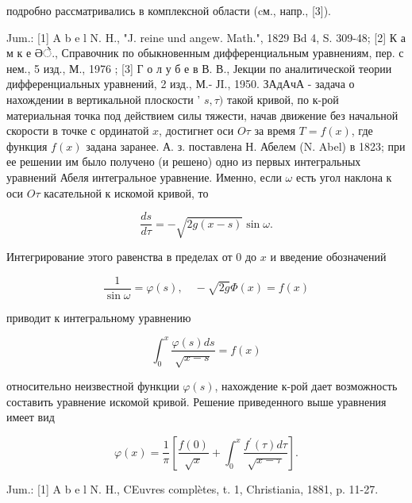 \documentclass[10pt]{article}
\begin{document}
подробно рассматривались в комплексной области (cм., напр., [3]).



Jum.: [1] A b e l N. H., "J. reine und angew. Math.", 1829 Bd 4, S. 309-48; [2] К а м к е Әे., Справочник по обыкновенным дифференциальным уравнениям, пер. с нем., 5 изд., М., 1976 ; [3] Г о л у б е в В. В., Јекции по аналитической теории дифференциальных уравнений, 2 изд., М.- ЈI., 1950. ЗАдАчА - задача о нахождении в вертикальной плоскости ' $s, \tau)$ такой кривой, по к-рой материальная точка под действием силы тяжести, начав движение без начальной скорости в точке с ординатой $x$, достигнет оси $O \tau$ за время $T=f(x)$, где функция $f(x)$ задана заранее. А. з. поставлена Н. Абелем (N. Abel) в 1823; при ее решении им было получено (и решено) одно из первых интегральных уравнений Абеля интегральное уравнение. Именно, если $\omega$ есть угол наклона к оси $O \tau$ касательной к искомой кривой, то



\[

\frac{d s}{d \tau}=-\sqrt{2 g(x-s)} \sin \omega .

\]



Интегрирование этого равенства в пределах от 0 до $x$ и введение обозначений



\[

\frac{1}{\sin \omega}=\varphi(s), \quad-\sqrt{2 g} \Phi(x)=f(x)

\]



приводит к интегральному уравнению



\[

\int_{0}^{x} \frac{\varphi(s) d s}{\sqrt{x-s}}=f(x)

\]



относительно неизвестной функции $\varphi(s)$, нахождение к-рой дает возможность составить уравнение искомой кривой. Решение приведенного выше уравнения имеет вид



\[

\varphi(x)=\frac{1}{\pi}\left[\frac{f(0)}{\sqrt{x}}+\int_{0}^{x} \frac{f^{\prime}(\tau) d \tau}{\sqrt{x-\tau}}\right] .

\]



Jum.: [1] A b e l N. H., CEuvres complètes, t. 1, Christiania, 1881, p. 11-27.
\end{document}
